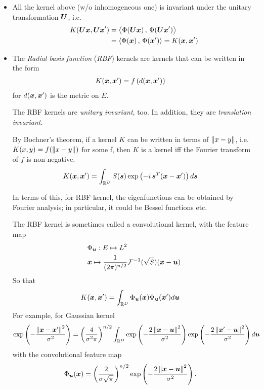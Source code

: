\documentclass[11pt]{article}
\begin{document}
\begin{itemize}
\item All the kernel above (w/o inhomogeneous one) is invariant  under the unitary transformation $\boldsymbol{U}$, i.e. 
\begin{align*}
K(\boldsymbol{Ux}, \boldsymbol{Ux}') &= \left\langle \Phi(\boldsymbol{Ux})\,,\, \Phi(\boldsymbol{Ux}') \right\rangle \\
&= \left\langle \Phi(\boldsymbol{x})\,,\, \Phi(\boldsymbol{x}') \right\rangle = K(\boldsymbol{x}, \boldsymbol{x}') 
\end{align*}\vspace{5pt}


\item The \emph{Radial basis function} (\textit{RBF}) kernels are kernels that can be written in the form
\begin{align}
K(\boldsymbol{x}, \boldsymbol{x}') &= f\left(d(\boldsymbol{x}, \boldsymbol{x}')\right) \label{eqn: RBF_Kernel}
\end{align} for $d(\boldsymbol{x}, \boldsymbol{x}')$ is the metric on $E$.

The RBF kernels are \emph{unitary invariant}, too. In addition, they are \emph{translation invariant}.

By Bochner's theorem, if a kernel $K$ can be written in terms of $\left\|x - y\right\|_{}$, i.e. $K(x, y) = f(\left\|x -y\right\|_{})$ for some f, then $K$ is a kernel iff the Fourier transform of $f$ is non-negative.
\begin{align*}
K(\boldsymbol{x}, \boldsymbol{x}') &= \int_{{\mathbb R}^{D}}S(\boldsymbol{s})\exp\left(-i\,\boldsymbol{s}^{T}(\boldsymbol{x}-\boldsymbol{x}') \right)d\boldsymbol{s}
\end{align*}

In terms of this, for RBF kernel, the eigenfunctions can be obtained by Fourier analysis; in particular, it could be Bessel functions etc.

The RBF kernel is sometimes called a convolutional kernel, with the feature map
\begin{align*}
&\Phi_{\boldsymbol{u}}: E\mapsto L^{2}\\ 
&\boldsymbol{x} \mapsto \frac{1}{(2\pi)^{n/2}}{\mathcal F}^{-1}(\sqrt{S})(\boldsymbol{x}-\boldsymbol{u})
\end{align*}
So that 
\begin{align*}
K(\boldsymbol{x}, \boldsymbol{x}') &= \int_{{\mathbb R}^{D}}\Phi_{\boldsymbol{u}}(\boldsymbol{x})\Phi_{\boldsymbol{u}}(\boldsymbol{x}')d\boldsymbol{u}
\end{align*}
For example, for Gaussian kernel
\begin{align*}
\exp\left(- \frac{\left\|\boldsymbol{x}-\boldsymbol{x}'\right\|_{}^{2}}{\sigma^{2}}\right) &= \left(\frac{4}{\sigma^{2}\pi}\right)^{n/2}\int_{{\mathbb R}^{D}}
 \exp\left(- \frac{2\left\|\boldsymbol{x}-\boldsymbol{u}\right\|_{}^{2}}{\sigma^{2}}\right)\exp\left(- \frac{2\left\|\boldsymbol{x}'-\boldsymbol{u}\right\|_{}^{2}}{\sigma^{2}}\right)d\boldsymbol{u}
\end{align*}
with the convolutional  feature map
\begin{align*}
\Phi_{\boldsymbol{u}}(\boldsymbol{x}) &= \left(\frac{2}{\sigma\sqrt{\pi}}\right)^{n/2}\exp\left(- \frac{2\left\|\boldsymbol{x}-\boldsymbol{u}\right\|_{}^{2}}{\sigma^{2}}\right).
\end{align*}


\end{itemize}
\newpage


\end{document}
